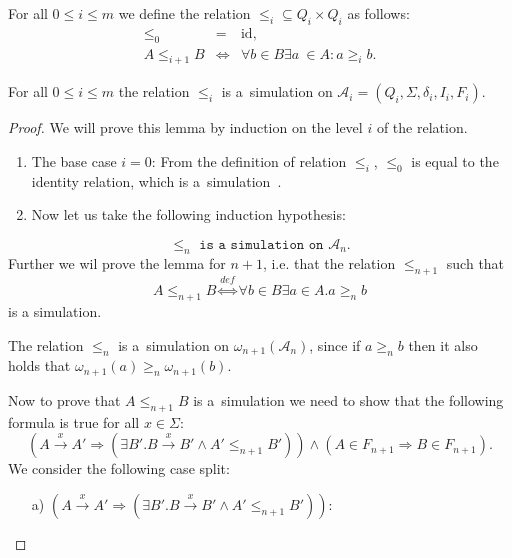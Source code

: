 \begin{defz}\label{simulation-definition}
 For all $0 \leq i \leq m$ we define the relation $\leq_i \subseteq Q_i \times
 Q_i$ as follows:
 \begin{eqnarray}
  \leq_0 & = & \text{id},\\
  A \leq_{i+1} B & \Leftrightarrow & \forall b \in B \exists a~\in A: a \geq_i
  b.
 \end{eqnarray}
\end{defz}

\begin{lemma}
 For all $0 \leq i \leq m$ the relation $\leq_i$ is a~simulation on
 $\mathcal{A}_i = (Q_i, \Sigma, \delta_i, I_i, F_i)$.
\end{lemma}
\begin{proof}
 We will prove this lemma by induction on the level $i$ of the relation.
 
 \begin{enumerate}
   \item The base case $i = 0$: From the definition of relation $\leq_i$,
   $\leq_0$ is equal to the identity relation, which is
   a~simulation~\cite{tacas}.
   \item Now let us take the following induction hypothesis:
 \end{enumerate}
 \begin{equation}
  \leq_n \texttt{ is a simulation on } \mathcal{A}_n.
 \end{equation}
 Further we wil prove the lemma for $n+1$, i.e. that the relation $\leq_{n+1}$
 such that
 \begin{equation}
 A \leq_{n+1} B \overset{\mathit{def}}{\Leftrightarrow} \forall b \in B
 \exists a \in A. a \geq_n b
 \end{equation}
 is a simulation.
 
 The relation $\leq_n$ is a~simulation on $\omega_{n+1}(\mathcal{A}_n)$,
 since if $a \geq_n b$ then it also holds that
 $\omega_{n+1}(a) \geq_n \omega_{n+1}(b)$.
 
 Now to prove that $A \leq_{n+1} B$ is a~simulation we need to show that the
 following formula is true for all $x \in \Sigma$:
 \begin{equation}
 (A \overset{x}{\rightarrow} A' \Rightarrow (\exists B'. B
 \overset{x}{\rightarrow} B' \wedge A' \leq_{n+1} B')) \wedge (A \in F_{n+1}
 \Rightarrow B \in F_{n+1}).
 \end{equation}
 \newpage
 We consider the following case split:
 
 \begin{itemize}
   \item[a)] $(A \overset{x}{\rightarrow} A' \Rightarrow (\exists B'. B
 \overset{x}{\rightarrow} B' \wedge A' \leq_{n+1} B'))$:
 \end{itemize}
 

\end{proof}
